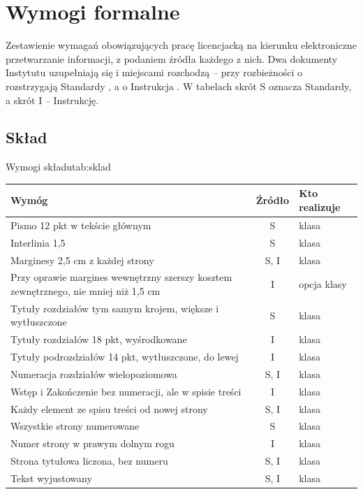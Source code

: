 \chapter{Wymogi formalne}\label{ch:wymogi}

Zestawienie wymagań obowiązujących pracę licencjacką na kierunku elektroniczne przetwarzanie informacji, z podaniem źródła każdego z nich. Dwa dokumenty Instytutu uzupełniają się i miejscami rozchodzą -- przy rozbieżności o  rozstrzygają Standardy \parencite{standardyEPI}, a o  Instrukcja \parencite{instrukcjaISI}. W tabelach skrót S oznacza Standardy, a skrót I -- Instrukcję.

\section{Skład}

\begin{tabelaepi}{Wymogi składu}{tab:sklad}
\begin{tabular}{@{}p{8.4cm}cp{3.4cm}@{}}
\toprule
Wymóg & Źródło & Kto realizuje \\
\midrule
Pismo 12 pkt w tekście głównym & S & klasa \\
Interlinia 1,5 & S & klasa \\
Marginesy 2,5 cm z każdej strony & S, I & klasa \\
Przy oprawie margines wewnętrzny szerszy kosztem zewnętrznego, nie mniej niż 1,5 cm & I & opcja klasy \\
Tytuły rozdziałów tym samym krojem, większe i wytłuszczone & S & klasa \\
Tytuły rozdziałów 18 pkt, wyśrodkowane & I & klasa \\
Tytuły podrozdziałów 14 pkt, wytłuszczone, do lewej & I & klasa \\
Numeracja rozdziałów wielopoziomowa & S, I & klasa \\
Wstęp i Zakończenie bez numeracji, ale w spisie treści & I & klasa \\
Każdy element ze spisu treści od nowej strony & S, I & klasa \\
Wszystkie strony numerowane & S & klasa \\
Numer strony w prawym dolnym rogu & I & klasa \\
Strona tytułowa liczona, bez numeru & S, I & klasa \\
Tekst wyjustowany & S, I & klasa \\
\bottomrule
\end{tabular}
\end{tabelaepi}

